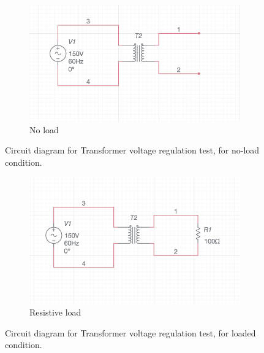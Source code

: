 \begin{figure}[H]
    \begin{subfigure}{\textwidth}
        \centering
        \includegraphics[width=.8\linewidth]{images/output/nol.png}
        \caption*{No load}
        \label{fig:sfig1}
    \end{subfigure}
    \caption{Circuit diagram for Transformer voltage regulation test, for no-load condition.}
\end{figure}
\begin{figure}[t]
    \begin{subfigure}{\textwidth}
        \centering
        \includegraphics[width=.8\linewidth]{images/output/fl.png}
        \caption*{Resistive load}
        \label{fig:sfig2}
    \end{subfigure}
    \caption{Circuit diagram for Transformer voltage regulation test, for loaded condition.}
    \label{fig:fig}
\end{figure}
\vfill